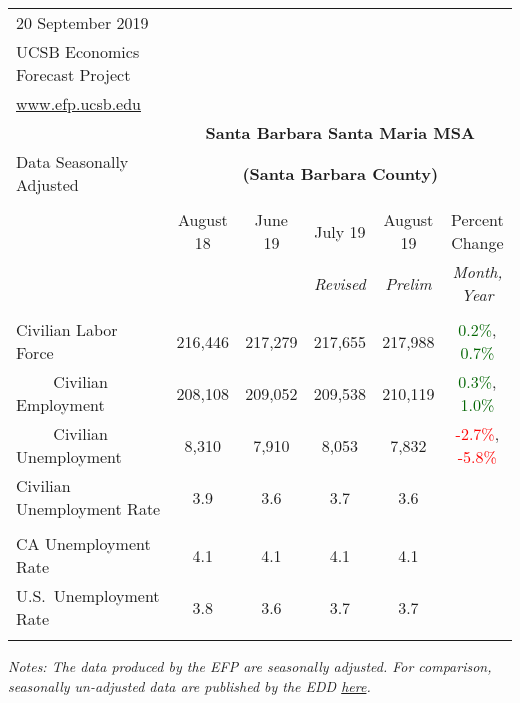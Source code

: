 \documentclass[12pt]{article}
\begin{document}
\begin{table}
\begin{tabular}{|l|c|c|c|c|c|}
\multicolumn{1}{l}{\small 20 September 2019} & \multicolumn{5}{c}{} \\
\multicolumn{1}{l}{\small UCSB Economics Forecast Project} & \multicolumn{5}{c}{} \\
\multicolumn{1}{l}{\small \href{http://www.efp.ucsb.edu/}{www.efp.ucsb.edu}} & \multicolumn{5}{c}{} \\
\multicolumn{1}{c}{} & \multicolumn{5}{c}{\large \textbf{Santa Barbara Santa Maria MSA}} \\
\multicolumn{1}{l}{\small Data Seasonally Adjusted} & \multicolumn{5}{c}{\small \textbf{(Santa Barbara County)}} \\ \hline \hline
& & & & & \\
 & August 18 & June 19 & July 19 & August 19 & Percent Change \\
 & & & \small \textit{Revised} & \small \textit{Prelim} & \small \textit{Month, Year} \\ \hline
& & & & & \\
Civilian Labor Force & 216,446 & 217,279 & 217,655 & 217,988 & \textcolor{darkgreen}{0.2\%}, \textcolor{darkgreen}{0.7\%} \\
$\qquad$ \small Civilian Employment & 208,108 & 209,052 & 209,538 & 210,119 & \textcolor{darkgreen}{0.3\%}, \textcolor{darkgreen}{1.0\%} \\
$\qquad$ \small Civilian Unemployment & 8,310 & 7,910 & 8,053 & 7,832 & \textcolor{red}{-2.7\%}, \textcolor{red}{-5.8\%} \\
Civilian Unemployment Rate & 3.9 & 3.6 & 3.7 & 3.6 & \\
& & & & & \\
CA Unemployment Rate & 4.1 & 4.1 & 4.1 & 4.1 & \\
U.S.\ Unemployment Rate & 3.8 & 3.6 & 3.7 & 3.7 & \\
& & & & & \\ \hline \hline
\end{tabular}
\par
\vspace{.5em}
\footnotesize
\textit{Notes: The data produced by the EFP are seasonally adjusted. For comparison, seasonally un-adjusted data are published by the EDD \href{http://www.labormarketinfo.ca.gov/file/lfmonth/satb$pds.pdf}{here}.}
\end{table}
\end{document}
